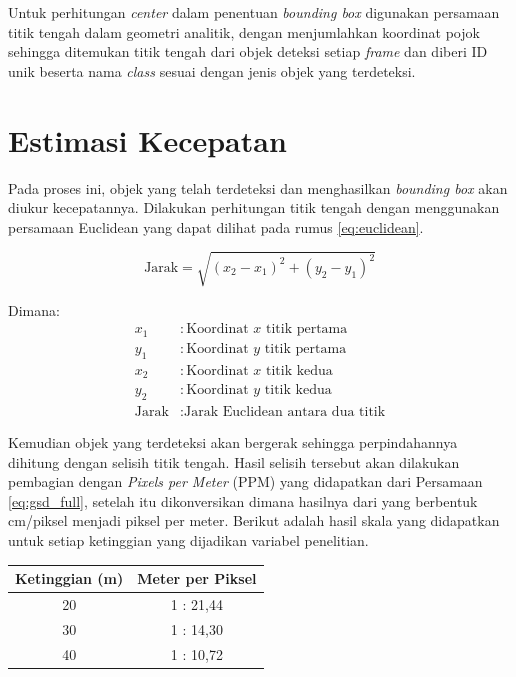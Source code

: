 Untuk perhitungan \emph{center} dalam penentuan \emph{bounding box} digunakan persamaan titik tengah dalam geometri analitik, dengan menjumlahkan koordinat pojok sehingga ditemukan titik tengah dari objek deteksi setiap \emph{frame} dan diberi ID unik beserta nama \emph{class} sesuai dengan jenis objek yang terdeteksi.

\section{Estimasi Kecepatan}
Pada proses ini, objek yang telah terdeteksi dan menghasilkan \emph{bounding box} akan diukur kecepatannya. Dilakukan perhitungan titik tengah dengan menggunakan persamaan Euclidean yang dapat dilihat pada rumus \ref{eq:euclidean}.

\begin{equation}
  \label{eq:euclidean}
  \text{Jarak} = \sqrt{(x_2 - x_1)^2 + (y_2 - y_1)^2}
\end{equation}

\begin{flushleft}
Dimana:
\begin{align*}
x_1 & : \text{Koordinat $x$ titik pertama} \\
y_1 & : \text{Koordinat $y$ titik pertama} \\
x_2 & : \text{Koordinat $x$ titik kedua} \\
y_2 & : \text{Koordinat $y$ titik kedua} \\
\text{Jarak} & : \text{Jarak Euclidean antara dua titik}
\end{align*}
\end{flushleft}

Kemudian objek yang terdeteksi akan bergerak sehingga perpindahannya dihitung dengan selisih titik tengah. Hasil selisih tersebut akan dilakukan pembagian dengan \emph{Pixels per Meter} (PPM) yang didapatkan dari Persamaan \ref{eq:gsd_full}, setelah itu dikonversikan dimana hasilnya dari yang berbentuk cm/piksel menjadi piksel per meter. Berikut adalah hasil skala yang didapatkan untuk setiap ketinggian yang dijadikan variabel penelitian. 

\begin{table}[h!]
  \centering
  \label{tbl:skala_ppm}
  \begin{tabular}{|c|c|}
    \hline
    \rowcolor[gray]{0.9}
    \textbf{Ketinggian (m)} & \textbf{Meter per Piksel} \\ \hline
    20                      & 1 : 21,44                 \\ \hline
    30                      & 1 : 14,30                 \\ \hline
    40                      & 1 : 10,72                 \\ \hline
  \end{tabular}
\end{table}

